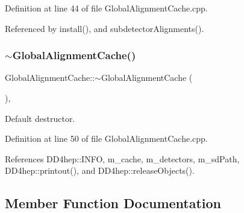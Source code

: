 Definition at line 44 of file Global\+Alignment\+Cache.\+cpp.



Referenced by install(), and subdetector\+Alignments().

\hypertarget{class_d_d4hep_1_1_alignments_1_1_global_alignment_cache_a130666c02ddc1ffee8ae3d0da29dea49}{}\label{class_d_d4hep_1_1_alignments_1_1_global_alignment_cache_a130666c02ddc1ffee8ae3d0da29dea49} 
\subsubsection{\texorpdfstring{$\sim$\+Global\+Alignment\+Cache()}{~GlobalAlignmentCache()}}
{\footnotesize\ttfamily Global\+Alignment\+Cache\+::$\sim$\+Global\+Alignment\+Cache (\begin{DoxyParamCaption}{ }\end{DoxyParamCaption})\hspace{0.3cm}{\ttfamily [protected]}, {\ttfamily [virtual]}}



Default destructor. 



Definition at line 50 of file Global\+Alignment\+Cache.\+cpp.



References D\+D4hep\+::\+I\+N\+FO, m\+\_\+cache, m\+\_\+detectors, m\+\_\+sd\+Path, D\+D4hep\+::printout(), and D\+D4hep\+::release\+Objects().



\subsection{Member Function Documentation}
\hypertarget{class_d_d4hep_1_1_alignments_1_1_global_alignment_cache_a51e8931621f844f3f81517f221b5fe98}{}\label{class_d_d4hep_1_1_alignments_1_1_global_alignment_cache_a51e8931621f844f3f81517f221b5fe98} 
